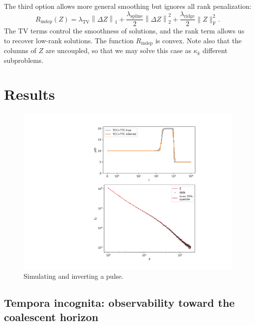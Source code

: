 \documentclass[11pt]{article}
\begin{document}
The third option allows more general smoothing but ignores all rank penalization:
\begin{equation}
  \label{eq:regularization_soft}
  R_\mathrm{indep}(Z)
  =
  \lambda_\mathrm{TV}
  \left\|\Delta Z\right\|_1
  +
  \frac{\lambda_\mathrm{spline}}{2} \left\|\Delta Z\right\|_2^2
  +
  \frac{\lambda_\mathrm{ridge}}{2} \| Z \|_\mathrm{F}^2
  .
\end{equation}
The TV terms control the smoothness of solutions,
and the rank term allows us to recover low-rank solutions.
The function $R_\mathrm{indep}$ is convex.
Note also that the columns of $Z$ are uncoupled,
so that we may solve this case as $\kappa_k$ different subproblems.


\section*{Results}\label{sec:results}


\begin{figure}
  \centering
  \includegraphics[width=.7\textwidth]{figures/fit_teaser}
  \caption{Simulating and inverting a pulse.}
  \label{}
\end{figure}

\subsection*{Tempora incognita: observability toward the coalescent horizon}\label{sec:model:loss}
\end{document}
